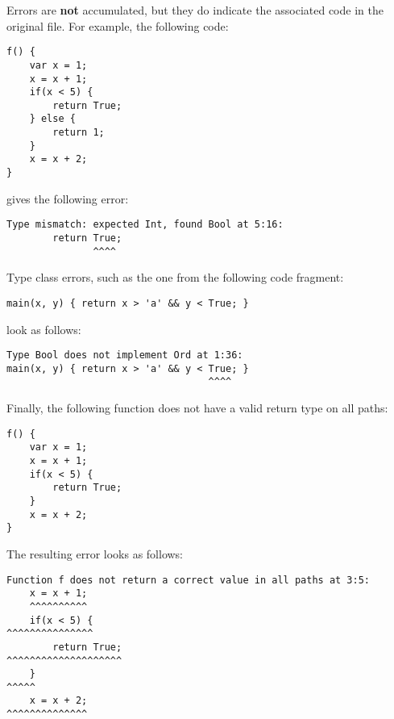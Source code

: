 Errors are \textbf{not} accumulated, but they do indicate the associated code in the original file. For example, the following code:

\begin{lstlisting}
f() {
    var x = 1;
    x = x + 1;
    if(x < 5) {
        return True;
    } else {
        return 1;
    }
    x = x + 2;
}
\end{lstlisting}

gives the following error:

\begin{lstlisting}[language={}]
Type mismatch: expected Int, found Bool at 5:16:
        return True;
               ^^^^
\end{lstlisting}

Type class errors, such as the one from the following code fragment:

\begin{lstlisting}
main(x, y) { return x > 'a' && y < True; }
\end{lstlisting}

look as follows:

\begin{lstlisting}[language={}]
Type Bool does not implement Ord at 1:36:
main(x, y) { return x > 'a' && y < True; }
                                   ^^^^
\end{lstlisting}

Finally, the following function does not have a valid return type on all paths:

\begin{lstlisting}
f() {
    var x = 1;
    x = x + 1;
    if(x < 5) {
        return True;
    }
    x = x + 2;
}
\end{lstlisting}

The resulting error looks as follows:

\begin{lstlisting}[language={}]
Function f does not return a correct value in all paths at 3:5:
    x = x + 1;
    ^^^^^^^^^^
    if(x < 5) {
^^^^^^^^^^^^^^^
        return True;
^^^^^^^^^^^^^^^^^^^^
    }
^^^^^
    x = x + 2;
^^^^^^^^^^^^^^
\end{lstlisting}
